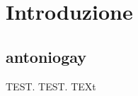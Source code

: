 \chapter{Introduzione}
\label{chap:introduction}
\section{antoniogay}
\label{sect:gay}
TEST.
TEST.
TEXt
